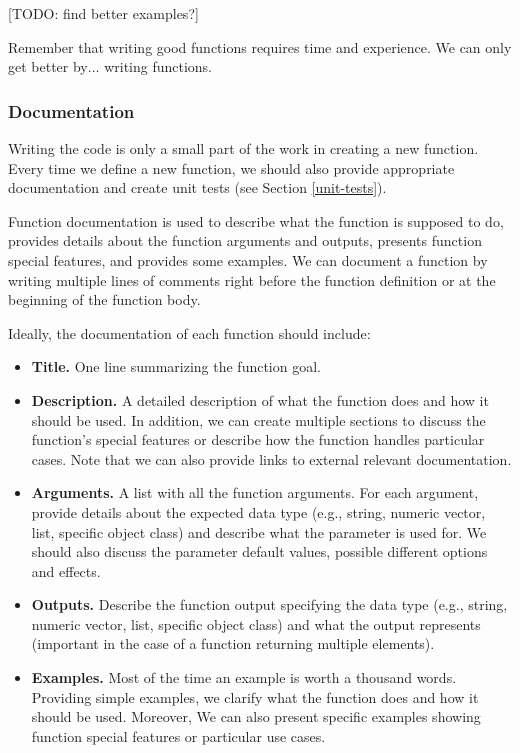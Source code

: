 \documentclass[
  11pt,
]{book}
\providecommand{\tightlist}{%
  \setlength{\itemsep}{0pt}\setlength{\parskip}{0pt}}
\begin{document}
{[}TODO: find better examples?{]}

Remember that writing good functions requires time and experience. We can only get better by\(\ldots\) writing functions.

\hypertarget{documentation-coding}{%
\subsubsection{Documentation}\label{documentation-coding}}

Writing the code is only a small part of the work in creating a new function. Every time we define a new function, we should also provide appropriate documentation and create unit tests (see Section \ref{unit-tests}).

Function documentation is used to describe what the function is supposed to do, provides details about the function arguments and outputs, presents function special features, and provides some examples. We can document a function by writing multiple lines of comments right before the function definition or at the beginning of the function body.

Ideally, the documentation of each function should include:

\begin{itemize}
\tightlist
\item
  \textbf{Title.} One line summarizing the function goal.
\item
  \textbf{Description.} A detailed description of what the function does and how it should be used. In addition, we can create multiple sections to discuss the function's special features or describe how the function handles particular cases. Note that we can also provide links to external relevant documentation.
\item
  \textbf{Arguments.} A list with all the function arguments. For each argument, provide details about the expected data type (e.g., string, numeric vector, list, specific object class) and describe what the parameter is used for. We should also discuss the parameter default values, possible different options and effects.
\item
  \textbf{Outputs.} Describe the function output specifying the data type (e.g., string, numeric vector, list, specific object class) and what the output represents (important in the case of a function returning multiple elements).
\item
  \textbf{Examples.} Most of the time an example is worth a thousand words. Providing simple examples, we clarify what the function does and how it should be used. Moreover, We can also present specific examples showing function special features or particular use cases.
\end{itemize}
\end{document}

